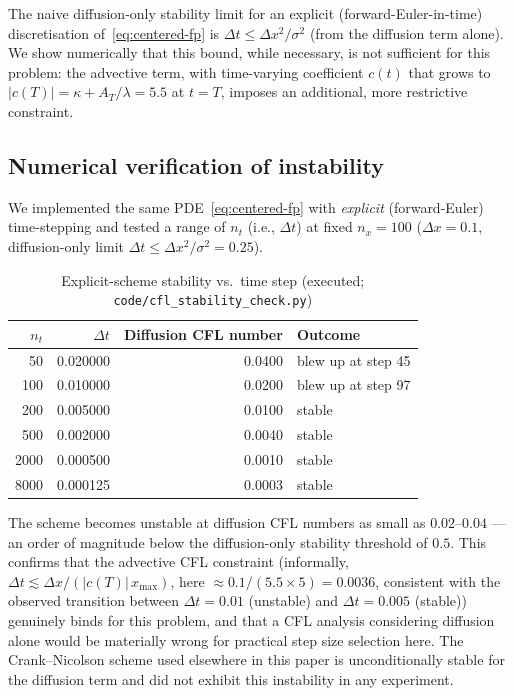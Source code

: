 \documentclass[11pt]{article}
\theoremstyle{remark}
\begin{document}
The naive diffusion-only stability limit for an explicit (forward-Euler-in-time)
discretisation of~\eqref{eq:centered-fp} is $\Delta t \le \Delta x^2/\sigma^2$
(from the diffusion term alone). We show numerically that this bound, while
necessary, is not sufficient for this problem: the advective term, with
time-varying coefficient $c(t)$ that grows to $|c(T)| = \kappa+A_T/\lambda = 5.5$
at $t=T$, imposes an additional, more restrictive constraint.

\subsection{Numerical verification of instability}

We implemented the same PDE~\eqref{eq:centered-fp} with \emph{explicit}
(forward-Euler) time-stepping and tested a range of $n_t$ (i.e., $\Delta t$) at
fixed $n_x=100$ ($\Delta x = 0.1$, diffusion-only limit $\Delta t \le \Delta
x^2/\sigma^2 = 0.25$).

\begin{table}[ht]
\centering
\caption{Explicit-scheme stability vs.\ time step (executed;
\texttt{code/cfl\_stability\_check.py})}
\label{tab:cfl-results}
\begin{tabular}{rrrl}
\toprule
$n_t$ & $\Delta t$ & Diffusion CFL number & Outcome \\
\midrule
50   & 0.020000 & 0.0400 & blew up at step 45 \\
100  & 0.010000 & 0.0200 & blew up at step 97 \\
200  & 0.005000 & 0.0100 & stable \\
500  & 0.002000 & 0.0040 & stable \\
2000 & 0.000500 & 0.0010 & stable \\
8000 & 0.000125 & 0.0003 & stable \\
\bottomrule
\end{tabular}
\end{table}

The scheme becomes unstable at diffusion CFL numbers as small as $0.02$--$0.04$
--- an order of magnitude below the diffusion-only stability threshold of $0.5$.
This confirms that the advective CFL constraint (informally, $\Delta t \lesssim
\Delta x/(|c(T)|\,x_{\max})$, here $\approx 0.1/(5.5\times5)=0.0036$, consistent
with the observed transition between $\Delta t=0.01$ (unstable) and
$\Delta t=0.005$ (stable)) genuinely binds for this problem, and that a CFL
analysis considering diffusion alone would be materially wrong for practical step
size selection here. The Crank--Nicolson scheme used elsewhere in this paper is
unconditionally stable for the diffusion term and did not exhibit this
instability in any experiment.
\end{document}
